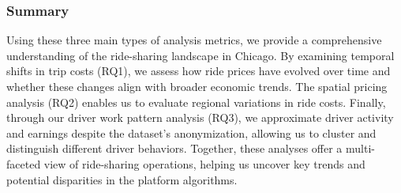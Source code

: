 

\subsubsection{Summary}
Using these three main types of analysis metrics, we provide a comprehensive understanding of the ride-sharing landscape in Chicago. By examining temporal shifts in trip costs (RQ1), we assess how ride prices have evolved over time and whether these changes align with broader economic trends. The spatial pricing analysis (RQ2) enables us to evaluate regional variations in ride costs. Finally, through our driver work pattern analysis (RQ3), we approximate driver activity and earnings despite the dataset's anonymization, allowing us to cluster and distinguish different driver behaviors. Together, these analyses offer a multi-faceted view of ride-sharing operations, helping us uncover key trends and potential disparities in the platform algorithms.